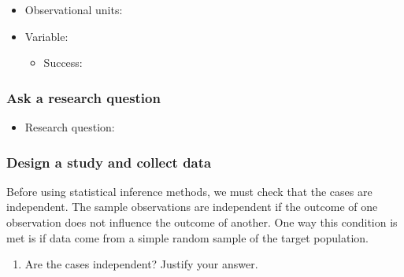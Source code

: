 \documentclass[
]{report}
\providecommand{\tightlist}{%
  \setlength{\itemsep}{0pt}\setlength{\parskip}{0pt}}
\begin{document}
\vspace{2mm}

\begin{itemize}
\tightlist
\item
  Observational units:
\end{itemize}

\vspace{2mm}

\begin{itemize}
\item
  Variable:

  \begin{itemize}
  \tightlist
  \item
    Success:
  \end{itemize}
\end{itemize}

\vspace{2mm}

\subsubsection*{Ask a research question}\label{ask-a-research-question}

\begin{itemize}
\tightlist
\item
  Research question:
\end{itemize}

\vspace{0.2in}

\subsubsection*{Design a study and collect data}\label{design-a-study-and-collect-data}

Before using statistical inference methods, we must check that the cases are independent. The sample observations are independent if the outcome of one observation does not influence the outcome of another. One way this condition is met is if data come from a simple random sample of the target population.

\begin{enumerate}
\def\labelenumi{\arabic{enumi}.}
\tightlist
\item
  Are the cases independent? Justify your answer.
\end{enumerate}
\end{document}
